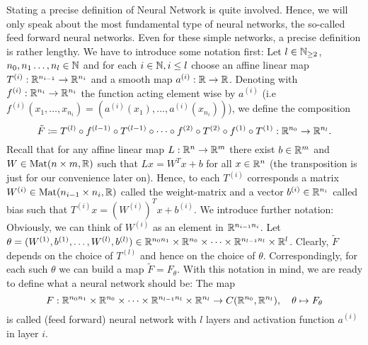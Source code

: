 Stating a precise definition of \glqq{}Neural Network\grqq{} is quite involved. 
Hence, we will only speak about the most fundamental type of neural networks, the so-called feed forward neural networks. 
Even for these simple networks, a precise definition is rather lengthy. We have to introduce some notation first:
Let $l\in\mathbb{N}_{\geq2}$, $n_0,n_1\dots,n_l\in\mathbb{N}$ and for each $i\in\mathbb{N}, i\leq l$ 
choose an affine linear map $T^{(i)}:\mathbb{R}^{n_{i-1}}\to\mathbb{R}^{n_i}$ and a smooth map $a^{(i)}:\mathbb{R}\to\mathbb{R}$.
Denoting with $f^{(i)}:\mathbb{R}^{n_i}\to\mathbb{R}^{n_i}$ the function acting element wise by $a^{(i)}$ (i.e $f^{(i)}(x_1, \dots, x_{n_i})=(a^{(i)}(x_1),\dots, a^{(i)}(x_{n_i}))$), 
we define the composition 
\begin{equation*} 
\tilde{F}\coloneq T^{(l)}\circ f^{(l-1)}\circ T^{(l-1)}\circ\dots\circ f^{(2)}\circ T^{(2)}\circ f^{(1)}\circ T^{(1)}:\mathbb{R}^{n_0}\to\mathbb{R}^{n_l}.
\end{equation*}
Recall that for any affine linear map $L:\mathbb{R}^n\to\mathbb{R}^m$ there exist $b\in\mathbb{R}^m$ and $W\in \text{Mat}(n\times m,\mathbb{R})$ such that 
$Lx=W^Tx+b$ for all $x\in\mathbb{R}^n$ (the transposition is just for our convenience later on). Hence, to each $T^{(i)}$ corresponds a matrix $W^{(i)}\in\text{Mat}(n_{i-1}\times n_i,\mathbb{R})$ called the weight-matrix and a vector
$b^{(i)}\in\mathbb{R}^{n_i}$ called bias such that $T^{(i)}x=\left(W^{(i)}\right)^Tx + b^{(i)}$.
We introduce further notation: Obviously, we can think of $W^{(i)}$ as an element in $\mathbb{R}^{n_{i-1}n_i}$. 
Let $\theta=(W^{(1)},b^{(1)},\dots,W^{(l)},b^{(l)})\in\mathbb{R}^{n_0n_1}\times\mathbb{R}^{n_0}\times\dots\times\mathbb{R}^{n_{l-1}n_l}\times\mathbb{R}^{l}$. 
Clearly, $\tilde{F}$ depends on the choice of $T^{(l)}$ and hence on the choice of $\theta$. 
Correspondingly, for each such $\theta$ we can build a map $\tilde{F}=F_\theta$.
With this notation in mind, we are ready to define what a neural network should be: The map
\begin{equation*}
    F:\mathbb{R}^{n_0n_1}\times\mathbb{R}^{n_0}\times\dots\times\mathbb{R}^{n_{l-1}n_l}\times\mathbb{R}^{n_l}\to C(\mathbb{R}^{n_0},\mathbb{R}^{n_l}), \quad\theta\mapsto F_\theta
\end{equation*}
is called (feed forward) neural network with $l$ layers and activation function $a^{(i)}$ in layer $i$.

